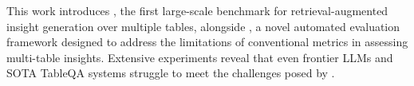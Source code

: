 This work introduces \bench, the first large-scale benchmark for retrieval-augmented insight generation over multiple tables, alongside \eval, a novel automated evaluation framework designed to address the limitations of conventional metrics in assessing multi-table insights. Extensive experiments reveal that even frontier LLMs and SOTA TableQA systems struggle to meet the challenges posed by \bench.